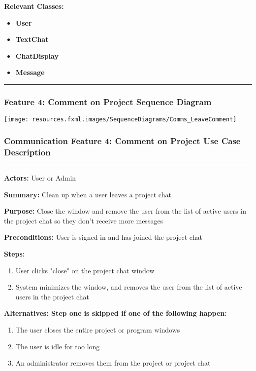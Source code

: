 \documentclass[twoside,letterpaper]{article}
\begin{document}
\noindent\textbf{Relevant Classes:}
\begin{itemize}
	\item \textbf{User}
	\item \textbf{TextChat}
	\item \textbf{ChatDisplay}
	\item \textbf{Message}
\end{itemize}
\hrule
\newpage

\subsubsection[Communication Feature 4: Comment on Project Sequence Diagram]{\rmfamily\bfseries\color{black}
	Feature 4: Comment on Project Sequence Diagram}
\hypertarget{RefHeading22059017292}{}

\bigskip

\texttt{[image: resources.fxml.images/SequenceDiagrams/Comms\_LeaveComment]}

\newpage

\subsubsection[Communication Feature 5: Close chat Use Case Description]{\rmfamily\bfseries\color{black}
	Communication Feature 4: Comment on Project Use Case Description}
\hypertarget{RefHeading22059017292}{}

\vspace{2pt}
\hrule
\vspace{8pt}
\textbf{Actors:} User or Admin \newline

\noindent\textbf{Summary:} Clean up when a user leaves a project chat \newline

\noindent\textbf{Purpose:} Close the window and remove the user from the list of active users in the project chat so they don't receive more messages \newline

\noindent\textbf{Preconditions:} User is signed in and has joined the project chat \newline

\noindent\textbf{Steps:} \begin{enumerate}
	\item User clicks "close" on the project chat window
	\item System minimizes the window, and removes the user from the list of active users in the project chat
\end{enumerate}
\noindent\textbf{Alternatives: Step one is skipped if one of the following happen: }
\begin{enumerate}
	\item The user closes the entire project or program windows
	\item The user is idle for too long
	\item An administrator removes them from the project or project chat
\end{enumerate}
\end{document}
